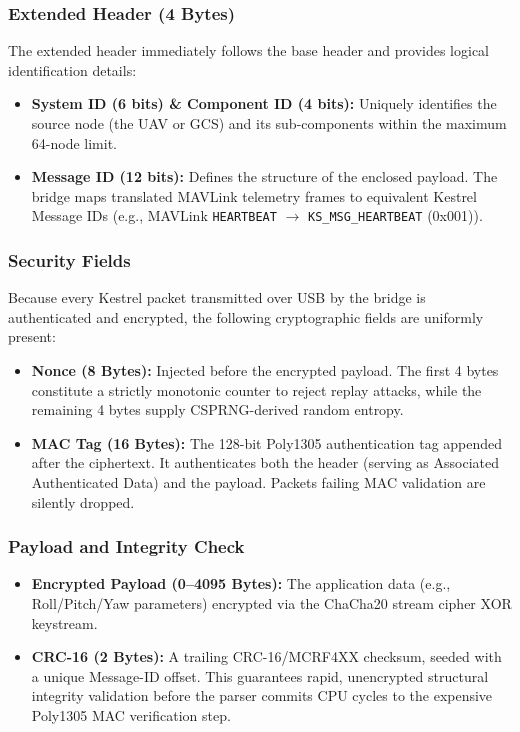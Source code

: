 \documentclass[11pt,a4paper]{article}
\begin{document}
\subsubsection{Extended Header (4 Bytes)}
The extended header immediately follows the base header and provides logical identification details:
\begin{itemize}[noitemsep]
    \item \textbf{System ID (6 bits) \& Component ID (4 bits):} Uniquely identifies the source node (the UAV or GCS) and its sub-components within the maximum 64-node limit.
    \item \textbf{Message ID (12 bits):} Defines the structure of the enclosed payload. The bridge maps translated MAVLink telemetry frames to equivalent Kestrel Message IDs (e.g., MAVLink \texttt{HEARTBEAT} $\rightarrow$ \texttt{KS\_MSG\_HEARTBEAT} (0x001)).
\end{itemize}

\subsubsection{Security Fields}
Because every Kestrel packet transmitted over USB by the bridge is authenticated and encrypted, the following cryptographic fields are uniformly present:
\begin{itemize}[noitemsep]
    \item \textbf{Nonce (8 Bytes):} Injected before the encrypted payload. The first 4 bytes constitute a strictly monotonic counter to reject replay attacks, while the remaining 4 bytes supply CSPRNG-derived random entropy.
    \item \textbf{MAC Tag (16 Bytes):} The 128-bit Poly1305 authentication tag appended after the ciphertext. It authenticates both the header (serving as Associated Authenticated Data) and the payload. Packets failing MAC validation are silently dropped.
\end{itemize}

\subsubsection{Payload and Integrity Check}
\begin{itemize}[noitemsep]
    \item \textbf{Encrypted Payload (0--4095 Bytes):} The application data (e.g., Roll/Pitch/Yaw parameters) encrypted via the ChaCha20 stream cipher XOR keystream.
    \item \textbf{CRC-16 (2 Bytes):} A trailing CRC-16/MCRF4XX checksum, seeded with a unique Message-ID offset. This guarantees rapid, unencrypted structural integrity validation before the parser commits CPU cycles to the expensive Poly1305 MAC verification step.
\end{itemize}
\end{document}
